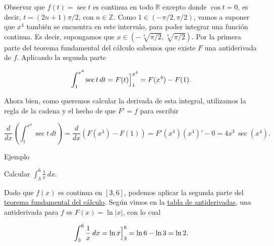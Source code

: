 \documentclass[
  letterpaper,
]{book}
\theoremstyle{plain}
\theoremstyle{remark}
\begin{document}
\begin{tcolorbox}[enhanced jigsaw, opacityback=0, left=2mm, opacitybacktitle=0.6, toprule=.15mm, bottomrule=.15mm, colbacktitle=quarto-callout-tip-color!10!white, titlerule=0mm, bottomtitle=1mm, title=\textcolor{quarto-callout-tip-color}{\faLightbulb}\hspace{0.5em}{Solución}, toptitle=1mm, colframe=quarto-callout-tip-color-frame, colback=white, breakable, rightrule=.15mm, arc=.35mm, leftrule=.75mm, coltitle=black]

Observar que \(f(t)=\sec t\) es continua en todo \(\mathbb{R}\) excepto
donde \(\cos t=0\), es decir, \(t=(2n+1)\pi/2\), con \(n\in\mathbb{Z}\).
Como \(1\in (-\pi/2,\pi/2)\), vamos a suponer que \(x^4\) también se
encuentra en este intervalo, para poder integrar una función continua.
Es decir, supongamos que \(x\in (-\sqrt[4]{\pi/2},\sqrt[4]{\pi/2})\).
Por la primera parte del teorema fundamental del cálculo sabemos que
existe \(F\) una antiderivada de \(f\). Aplicando la segunda parte

\[
\int_1^{x^4} \sec t\,dt=F(t)\Big{]}_{1}^{x^4}=F(x^4)-F(1).
\]

Ahora bien, como queremos calcular la derivada de esta integral,
utilizamos la regla de la cadena y el hecho de que \(F'=f\) para
escribir

\[
\frac{d}{dx}\left(\int_1^{x^4} \sec t\,dt\right)=\frac{d}{dx}\left(F(x^4)-F(1)\right)=F'(x^4) (x^4)'-0=4x^3 \,\sec(x^4).
\]

\end{tcolorbox}

Ejemplo

Calcular \(\displaystyle \int_3^{6} \frac{1}{x}\,dx\).

\begin{tcolorbox}[enhanced jigsaw, opacityback=0, left=2mm, opacitybacktitle=0.6, toprule=.15mm, bottomrule=.15mm, colbacktitle=quarto-callout-tip-color!10!white, titlerule=0mm, bottomtitle=1mm, title=\textcolor{quarto-callout-tip-color}{\faLightbulb}\hspace{0.5em}{Solución}, toptitle=1mm, colframe=quarto-callout-tip-color-frame, colback=white, breakable, rightrule=.15mm, arc=.35mm, leftrule=.75mm, coltitle=black]

Dado que \(f(x)\) es continua en \([3,6]\), podemos aplicar la segunda
parte del \hyperref[teo-TFC2]{teorema fundamental del cálculo}. Según
vimos en la \hyperref[tabla-antiderivadas]{tabla de antiderivadas}, una
antiderivada para \(f\) es \(F(x)=\ln |x|\), con lo cual

\[
\int_3^{6} \frac{1}{x}\,dx= \ln x\Big{]}_{3}^{6}=\ln 6-\ln 3=\ln 2.
\]

\end{tcolorbox}
\end{document}
